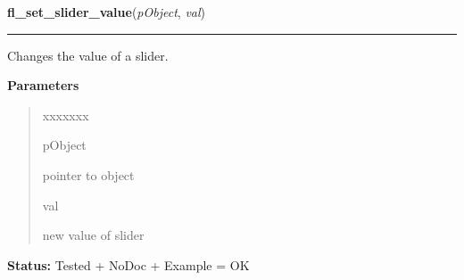     \label{xformslib:library:fl_set_slider_value}

    \vspace{0.5ex}

\hspace{.8\funcindent}\begin{boxedminipage}{\funcwidth}

    \raggedright \textbf{fl\_set\_slider\_value}(\textit{pObject}, \textit{val})

    \vspace{-1.5ex}

    \rule{\textwidth}{0.5\fboxrule}
\setlength{\parskip}{2ex}
    Changes the value of a slider.

\setlength{\parskip}{1ex}
      \textbf{Parameters}
      \vspace{-1ex}

      \begin{quote}
        \begin{Ventry}{xxxxxxx}

          \item[pObject]

          pointer to object

          \item[val]

          new value of slider

        \end{Ventry}

      \end{quote}

\textbf{Status:} Tested + NoDoc + Example = OK



    \end{boxedminipage}

    \label{xformslib:library:fl_get_slider_value}

    \vspace{0.5ex}

